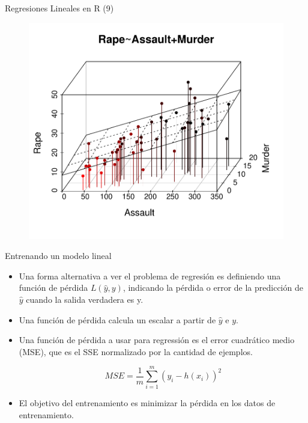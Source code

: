 \documentclass[handout]{beamer}
\begin{document}
\begin{frame}{Regresiones Lineales en R (9)}
 
\begin{figure}[h!]
	\centering
	\includegraphics[scale=0.6]{imagenes/reg3d.pdf}
\end{figure}
 
\end{frame}


\begin{frame}{Entrenando un modelo lineal}
\begin{scriptsize}
\begin{itemize}
\item Una forma alternativa a ver el problema de regresión es definiendo una  función de pérdida $L(\hat {y}, y)$, indicando la pérdida o error de la predicción de $\hat{y}$ cuando la salida verdadera es y.

\item Una función de pérdida calcula un escalar a partir de $\hat{y}$ e $y$. 

\item Una función de pérdida a usar  para regressión es el error cuadrático medio (MSE), que es el SSE normalizado por la cantidad de ejemplos.

\begin{equation}
MSE = \frac{1}{m}\sum_{i=1}^{m} (y_i-h(x_i))^2 
\end{equation}

\item El objetivo del entrenamiento es minimizar la pérdida en los datos de entrenamiento.


\end{itemize}


\end{scriptsize}
\end{frame}
\end{document}
